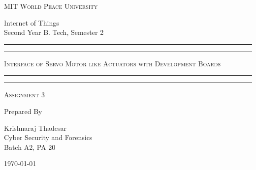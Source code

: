 \documentclass[11pt]{article}
\begin{document}
\begin{titlepage}
	\centering


	\huge\textsc{
		MIT World Peace University
	}\\

	\vspace{0.75\baselineskip} %

	\LARGE{
		Internet of Things\\
		Second Year B. Tech, Semester 2
	}

	\vfill %


	\rule{\textwidth}{1.6pt}\vspace*{-\baselineskip}\vspace*{2pt}
	\rule{\textwidth}{0.6pt}
	\vspace{0.75\baselineskip} %



	\huge{\textsc{
			Interface of Servo Motor like Actuators with Development Boards
		}} \\



	\vspace{0.5\baselineskip} %
	\rule{\textwidth}{0.6pt}\vspace*{-\baselineskip}\vspace*{2.8pt}
	\rule{\textwidth}{1.6pt}

	\vspace{1\baselineskip} %


	\LARGE\textsc{
		Assignment 3
	} %
	\vfill


	Prepared By
	\vspace{0.5\baselineskip} %

	\Large{
		Krishnaraj Thadesar \\
		Cyber Security and Forensics\\
		Batch A2, PA 20
	}


	\vspace{0.5\baselineskip} %
	\today

\end{titlepage}
\end{document}
